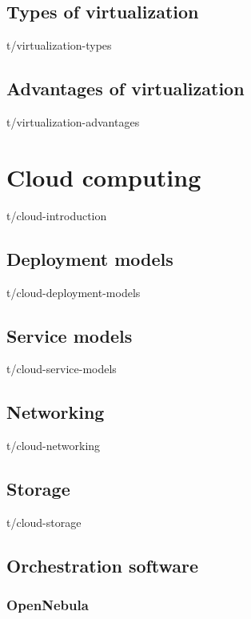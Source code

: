 \documentclass[12pt,oneside,a4paper]{report} %
\begin{document}
		\section{Types of virtualization}
		{t/virtualization-types}

		\section{Advantages of virtualization}
		{t/virtualization-advantages}
		\label{subsec:advantages-of-virtualization}

	\chapter{Cloud computing}
		{t/cloud-introduction}

		\section{Deployment models}
		{t/cloud-deployment-models}

		\section{Service models}
		{t/cloud-service-models}

		\section{Networking}
		{t/cloud-networking}

		\section{Storage}
		{t/cloud-storage}

		



		\section{Orchestration software}
			
			\subsection{OpenNebula}
\end{document}

